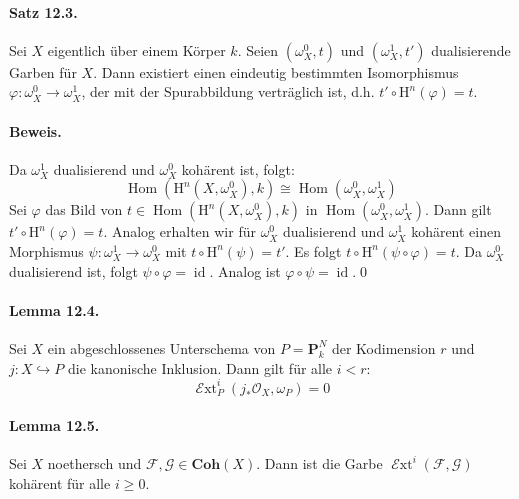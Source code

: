 \paragraph{Satz 12.3.}\label{12.3} Sei $X$ eigentlich über einem Körper $k$. Seien $(\omega_X^0,t)$ und $(\omega_X^1,t')$ dualisierende Garben für $X$. Dann existiert einen eindeutig bestimmten Isomorphismus $\varphi:\omega_X^0\to\omega_X^1$, der mit der Spurabbildung verträglich ist, d.h. $t'\circ\mathrm{H}^n(\varphi)=t$.

\paragraph{Beweis.} Da $\omega^1_X$ dualisierend und $\omega_X^0$ kohärent ist, folgt:
\[\operatorname{Hom}(\mathrm{H}^n(X,\omega^0_X),k)\cong\operatorname{Hom}(\omega_X^0,\omega_X^1)\]
Sei $\varphi$ das Bild von $t\in \operatorname{Hom}(\mathrm{H}^n(X,\omega^0_X),k)$ in $\operatorname{Hom}(\omega_X^0,\omega_X^1)$. Dann gilt $t'\circ\mathrm{H}^n(\varphi)=t$. Analog erhalten wir für $\omega_X^0$ dualisierend und $\omega_X^1$ kohärent einen Morphismus $\psi:\omega_X^1\to\omega_X^0$ mit $t\circ\mathrm{H}^n(\psi)=t'$. Es folgt $t\circ\mathrm{H}^n(\psi\circ\varphi)=t$. Da $\omega_X^0$ dualisierend ist, folgt $\psi\circ\varphi=\operatorname{id}$. Analog ist $\varphi\circ\psi=\operatorname{id}$.\qed

\paragraph{Lemma 12.4.}\label{12.4} Sei $X$ ein abgeschlossenes Unterschema von $P=\mathbf{P}_k^N$ der Kodimension $r$ und $j:X\hookrightarrow P$ die kanonische Inklusion. Dann gilt für alle $i<r$:
\[\operatorname{\mathcal{E}xt}^i_P(j_\ast\mathcal{O}_X,\omega_P)=0 \]

\paragraph{Lemma 12.5.}\label{12.5} Sei $X$ noethersch und $\mathcal{F},\mathcal{G}\in\mathbf{Coh}(X)$. Dann ist die Garbe $\operatorname{\mathcal{E}xt}^i(\mathcal{F},\mathcal{G})$ kohärent für alle $i\geq 0$.

